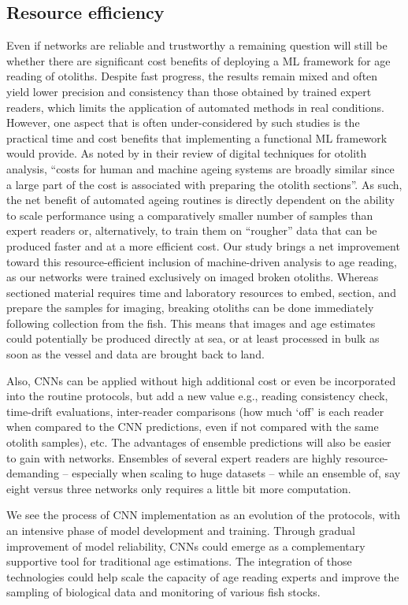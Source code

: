 \documentclass[10pt,letterpaper]{article}
\begin{document}
\subsection{Resource efficiency}
Even if networks are reliable and trustworthy a remaining question will still be whether there are significant cost benefits of deploying a ML framework for age reading of otoliths. Despite fast progress, the results remain mixed and often yield lower precision and consistency than those obtained by trained expert readers, which limits the application of automated methods in real conditions. However, one aspect that is often under-considered by such studies is the practical time and cost benefits that implementing a functional ML framework would provide. As noted by \citet{Fisher} in their review of digital techniques for otolith analysis, “costs for human and machine ageing systems are broadly similar since a large part of the cost is associated with preparing the otolith sections”. As such, the net benefit of automated ageing routines is directly dependent on the ability to scale performance using a comparatively smaller number of samples than expert readers or, alternatively, to train them on “rougher” data that can be produced faster and at a more efficient cost. Our study brings a net improvement toward this resource-efficient inclusion of machine-driven analysis to age reading, as our networks were trained exclusively on imaged broken otoliths. Whereas sectioned material requires time and laboratory resources to embed, section, and prepare the samples for imaging, breaking otoliths can be done immediately following collection from the fish. This means that images and age estimates could potentially be produced directly at sea, or at least processed in bulk as soon as the vessel and data are brought back to land. 

Also, CNNs can be applied without high additional cost or even be incorporated into the routine protocols, but add a new value e.g., reading consistency check, time-drift evaluations, inter-reader comparisons (how much ‘off’ is each reader when compared to the CNN predictions, even if not compared with the same otolith samples), etc.  The advantages of ensemble predictions will also be easier to gain with networks. Ensembles of several expert readers are highly resource-demanding – especially when scaling to huge datasets – while an ensemble of, say eight versus three networks only requires a little bit more computation.

We see the process of CNN implementation as an evolution of the protocols, with an intensive phase of model development and training. Through gradual improvement of model reliability, CNNs could emerge as a complementary supportive tool for traditional age estimations. The integration of those technologies could help scale the capacity of age reading experts and improve the sampling of biological data and monitoring of various fish stocks.
\end{document}
